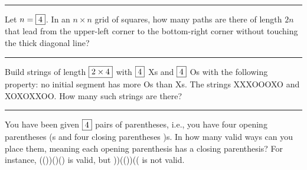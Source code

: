 \documentclass{article}
\newcommand{\splitpage}{\vfill\hrule\vfill}
\begin{document}
\splitpage

Let $n = \fbox{$4$}$.  In an $n \times n$ grid of squares, how many
paths are there of length $2n$ that lead from the upper-left corner to
the bottom-right corner without touching the thick diagonal line?

\renewcommand*{\xMin}{0}%
\renewcommand*{\xMax}{4}%
\renewcommand*{\yMin}{0}%
\renewcommand*{\yMax}{4}%
\begin{center}
\quad\raisebox{2cm}{or}\quad
{}
\quad\raisebox{2cm}{or\ldots?}
\end{center}

\splitpage

Build strings of length $\fbox{$2 \times 4$}$ with $\fbox{$4$}$ \textsf{X}s and
$\fbox{$4$}$ \textsf{O}s with the following property: no initial segment has
more \textsf{O}s than \textsf{X}s.  The strings \textsf{XXXOOOXO} and
\textsf{XOXOXXOO}.  How many such strings are there?

\splitpage

You have been given $\fbox{$4$}$ pairs of parentheses, i.e., you have
four opening parentheses \textsf{(}s and four closing parentheses
\textsf{)}s.  In how many valid ways can you place them, meaning each
opening parenthesis has a closing parenthesis?  For instance,
\textsf{(())()()} is valid, but \textsf{))(())((} is not valid.
\end{document}
